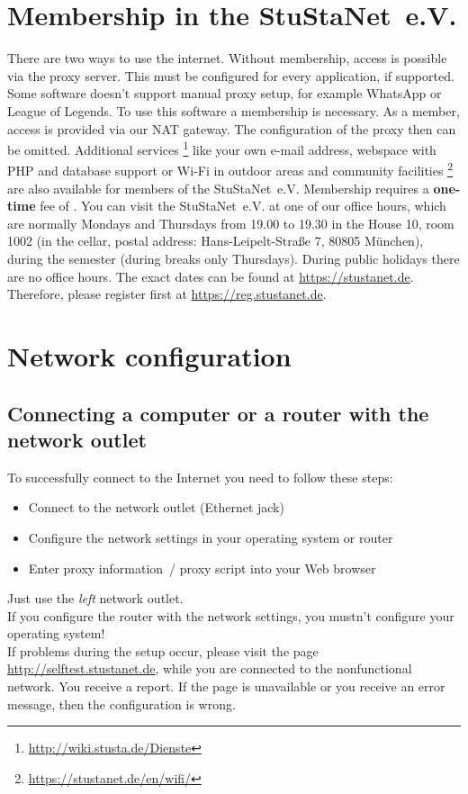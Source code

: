 \documentclass[a4paper,12pt]{scrartcl}
\begin{document}
\section*{Membership in the StuStaNet~e.V.}
There are two ways to use the internet. Without membership, access is possible via the proxy server. This must be configured for every application, if supported. Some software doesn't support manual proxy setup, for example WhatsApp or League of Legends. To use this software a membership is necessary.
\pagebreak\linebreak
As a member, access is provided via our NAT gateway. The configuration of the proxy then can be omitted. Additional services \footnote{\url{http://wiki.stusta.de/Dienste}} like your own e-mail address, webspace with PHP and database support or Wi-Fi in outdoor areas and community facilities \footnote{\url{https://stustanet.de/en/wifi/}} are also available for members of the StuStaNet~e.V. Membership requires a \textbf{one-time} fee of . You can visit the StuStaNet~e.V. at one of our office hours, which are normally Mondays and Thursdays from 19.00 to 19.30 in the House 10, room 1002 (in the cellar, postal address: Hans-Leipelt-Straße 7, 80805 München), during the semester (during breaks only Thursdays). During public holidays there are no office hours. The exact dates can be found at \mbox{\url{https://stustanet.de}}. Therefore, please register first at \mbox{\url{https://reg.stustanet.de}}.


\section*{Network configuration}
\subsection*{Connecting a computer or a router with the network outlet}

To successfully connect to the Internet you need to follow these steps:
\begin{itemize}
    \item Connect to the network outlet (Ethernet jack)
    \item Configure the network settings in your operating system or router
    \item Enter proxy information~/ proxy script into your Web browser
\end{itemize}
Just use the \emph{left} network outlet.\\
If you configure the router with the network settings, you mustn't configure your operating system!\\
If problems during the setup occur, please visit the page \mbox{\url{http://selftest.stustanet.de}}, while you are connected to the nonfunctional network. You receive a report. If the page is unavailable or you receive an error message, then the configuration is wrong.
\end{document}
